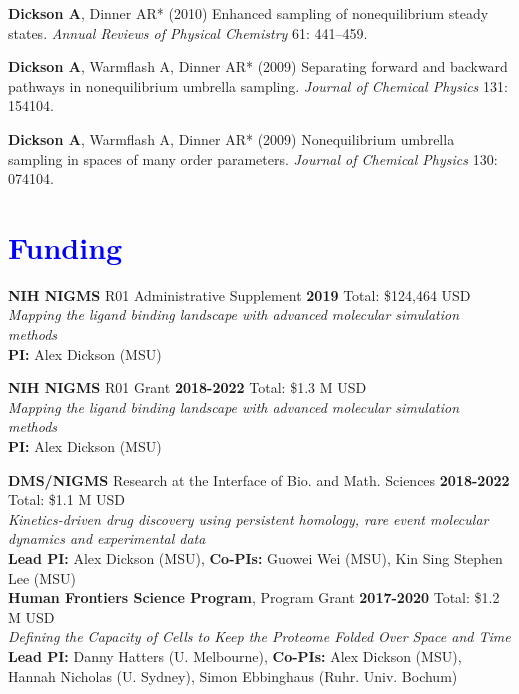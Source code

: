 \documentclass[margin,line]{res}
\begin{document}
\begin{resume}
\begin{spacing}{1.2}
\begin{thebibliography}{10}
{\bf Dickson A}, Dinner AR* (2010) Enhanced sampling of nonequilibrium steady states.
\newblock \textit{Annual Reviews of Physical Chemistry} 61: 441--459.

{\bf Dickson A}, Warmflash A, Dinner AR* (2009) Separating forward and backward
  pathways in nonequilibrium umbrella sampling.
\newblock \textit{Journal of Chemical Physics} 131: 154104.

{\bf Dickson A}, Warmflash A, Dinner AR* (2009) Nonequilibrium umbrella sampling in
  spaces of many order parameters.
\newblock \textit{Journal of Chemical Physics} 130: 074104.

\end{thebibliography}
\end{spacing}
\endgroup

\section{\sc \textcolor{blue}{Funding} }

{\bf NIH NIGMS} R01 Administrative Supplement \hfill {\bf 2019} Total: \$124,464 USD \\
\emph{Mapping the ligand binding landscape with advanced molecular simulation methods}\\
{\bf PI:} Alex Dickson (MSU)

{\bf NIH NIGMS} R01 Grant \hfill {\bf 2018-2022} Total: \$1.3 M USD \\
\emph{Mapping the ligand binding landscape with advanced molecular simulation methods}\\
{\bf PI:} Alex Dickson (MSU)

{\bf DMS/NIGMS} Research at the Interface of Bio. and Math. Sciences \hfill {\bf 2018-2022} Total: \$1.1 M USD \\
 \emph{Kinetics-driven drug discovery using persistent homology, rare event molecular dynamics and experimental data}\\
 {\bf Lead PI:} Alex Dickson (MSU), {\bf Co-PIs:} Guowei Wei (MSU), Kin Sing Stephen Lee (MSU)\\

{\bf Human Frontiers Science Program}, Program Grant \hfill {\bf 2017-2020} Total: \$1.2 M USD \\
 \emph{Defining the Capacity of Cells to Keep the Proteome Folded Over Space and Time}\\
 {\bf Lead PI:} Danny Hatters (U. Melbourne), {\bf Co-PIs:} Alex Dickson (MSU), Hannah Nicholas (U. Sydney), Simon Ebbinghaus (Ruhr. Univ. Bochum) \\


\end{resume}
\end{document}

